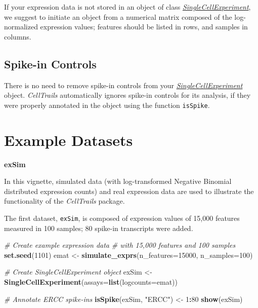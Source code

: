 \documentclass[]{book}
\newenvironment{Shaded}{\begin{snugshade}}{\end{snugshade}}
\newcommand{\KeywordTok}[1]{\textcolor[rgb]{0.13,0.29,0.53}{\textbf{#1}}}
\newcommand{\DataTypeTok}[1]{\textcolor[rgb]{0.13,0.29,0.53}{#1}}
\newcommand{\DecValTok}[1]{\textcolor[rgb]{0.00,0.00,0.81}{#1}}
\newcommand{\StringTok}[1]{\textcolor[rgb]{0.31,0.60,0.02}{#1}}
\newcommand{\CommentTok}[1]{\textcolor[rgb]{0.56,0.35,0.01}{\textit{#1}}}
\newcommand{\OperatorTok}[1]{\textcolor[rgb]{0.81,0.36,0.00}{\textbf{#1}}}
\newcommand{\NormalTok}[1]{#1}
\theoremstyle{definition}
\theoremstyle{definition}
\theoremstyle{definition}
\theoremstyle{remark}
\begin{document}
If your expression data is not stored in an object of class
\emph{\href{http://bioconductor.org/packages/SingleCellExperiment}{SingleCellExperiment}},
we suggest to initiate an object from a numerical matrix composed of the
log-normalized expression values; features should be listed in rows, and
samples in columns.

\subsection{Spike-in Controls}\label{spike-in-controls}

There is no need to remove spike-in controls from your
\emph{\href{http://bioconductor.org/packages/SingleCellExperiment}{SingleCellExperiment}}
object. \emph{CellTrails} automatically ignores spike-in controls for
its analysis, if they were properly annotated in the object using the
function \texttt{isSpike}.

\section{Example Datasets}\label{S-exdat}

\textbf{exSim}

In this vignette, simulated data (with log-transformed Negative Binomial
distributed expression counts) and real expression data are used to
illustrate the functionality of the \emph{CellTrails} package.

The first dataset, \texttt{exSim}, is composed of expression values of
15,000 features measured in 100 samples; 80 spike-in transcripts were
added.

\begin{Shaded}
\begin{Highlighting}[]
\CommentTok{# Create example expression data}
\CommentTok{# with 15,000 features and 100 samples}
\KeywordTok{set.seed}\NormalTok{(}\DecValTok{1101}\NormalTok{)}
\NormalTok{emat <-}\StringTok{ }\KeywordTok{simulate_exprs}\NormalTok{(}\DataTypeTok{n_features=}\DecValTok{15000}\NormalTok{, }\DataTypeTok{n_samples=}\DecValTok{100}\NormalTok{)}

\CommentTok{# Create SingleCellExperiment object}
\NormalTok{exSim <-}\StringTok{ }\KeywordTok{SingleCellExperiment}\NormalTok{(}\DataTypeTok{assays=}\KeywordTok{list}\NormalTok{(}\DataTypeTok{logcounts=}\NormalTok{emat))}

\CommentTok{# Annotate ERCC spike-ins }
\KeywordTok{isSpike}\NormalTok{(exSim, }\StringTok{"ERCC"}\NormalTok{) <-}\StringTok{ }\DecValTok{1}\OperatorTok{:}\DecValTok{80}
\KeywordTok{show}\NormalTok{(exSim)}
\end{Highlighting}
\end{Shaded}
\end{document}
